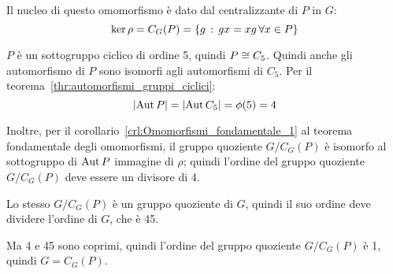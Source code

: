 \begin{soluzione}
    Il nucleo di questo omomorfismo è dato dal centralizzante di $P$ in $G$:
    \begin{equation*}
        \ker \rho = C_G(P) = \{g \,:\, gx = xg \,\forall x \in P\}
    \end{equation*}

    $P$ è un sottogruppo ciclico di ordine 5, quindi $P \cong C_5$.
    Quindi anche gli automorfismo di $P$ sono isomorfi agli automorfismi di $C_5$.
    Per il teorema~\ref{thr:automorfismi_gruppi_ciclici}:
    \begin{equation*}
        \lvert \operatorname{Aut} P \rvert = \lvert \operatorname{Aut} C_5 \rvert = \phi(5) = 4
    \end{equation*}

    Inoltre, per il corollario~\ref{crl:Omomorfismi_fondamentale_1} al teorema fondamentale degli omomorfismi,
    il gruppo quoziente $G/C_G(P)$ è isomorfo al sottogruppo di $\operatorname{Aut} P$ immagine di $\rho$;
    quindi l'ordine del gruppo quoziente $G/C_G(P)$ deve essere un divisore di 4.

    Lo stesso $G/C_G(P)$ è un gruppo quoziente di $G$, quindi il suo ordine deve dividere l'ordine di $G$, che è 45.

    Ma 4 e 45 sono coprimi, quindi l'ordine del gruppo quoziente $G/C_G(P)$ è 1, quindi $G = C_G(P)$.


\end{soluzione}
